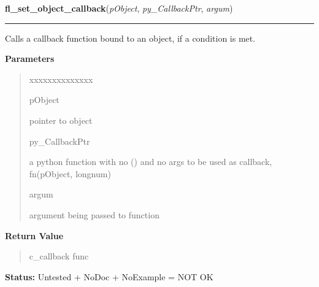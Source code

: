 \hspace{.8\funcindent}\begin{boxedminipage}{\funcwidth}

    \raggedright \textbf{fl\_set\_object\_callback}(\textit{pObject}, \textit{py\_CallbackPtr}, \textit{argum})

    \vspace{-1.5ex}

    \rule{\textwidth}{0.5\fboxrule}
\setlength{\parskip}{2ex}
    Calls a callback function bound to an object, if a condition is met.

\setlength{\parskip}{1ex}
      \textbf{Parameters}
      \vspace{-1ex}

      \begin{quote}
        \begin{Ventry}{xxxxxxxxxxxxxx}

          \item[pObject]

          pointer to object

          \item[py\_CallbackPtr]

          a python function with no () and no args to be used as callback, 
          fn(pObject, longnum)

          \item[argum]

          argument being passed to function

        \end{Ventry}

      \end{quote}

      \textbf{Return Value}
    \vspace{-1ex}

      \begin{quote}
      c\_callback func

      \end{quote}

\textbf{Status:} Untested + NoDoc + NoExample = NOT OK



    \end{boxedminipage}

    \label{xformslib:library:fl_set_object_lalign}

    \vspace{0.5ex}

